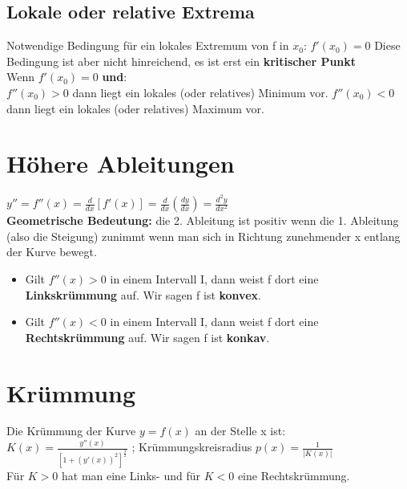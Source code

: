 \documentclass[../main.tex]{subfiles}
\begin{document}
\subsection{Lokale oder relative Extrema}
Notwendige Bedingung für ein lokales Extremum von f in $x_0$:
$f'(x_0) = 0$ Diese Bedingung ist aber nicht hinreichend, es ist erst ein \textbf{kritischer Punkt} \\ [14pt]
Wenn $f'(x_0) = 0$ \textbf{und}: \\
$f''(x_0) > 0$ dann liegt ein lokales (oder relatives) Minimum vor.
$f''(x_0) < 0$ dann liegt ein lokales (oder relatives) Maximum vor.

\section{Höhere Ableitungen}
$y'' = f''(x) = \frac{d}{dx}[f'(x)] = \frac{d}{dx}(\frac{dy}{dx}) = \frac{d^2y}{dx^2}$ \\ [7pt]
\textbf{Geometrische Bedeutung:} die 2. Ableitung ist positiv wenn die 1. Ableitung (also die Steigung) zunimmt wenn man sich in Richtung zunehmender x entlang der Kurve bewegt.
\begin{itemize}
    \item Gilt $f''(x) > 0$ in einem Intervall I, dann weist f dort eine \textbf{Linkskrümmung} auf. Wir sagen f ist \textbf{konvex}.
    \item Gilt $f''(x) < 0$ in einem Intervall I, dann weist f dort eine \textbf{Rechtskrümmung} auf. Wir sagen f ist \textbf{konkav}.
\end{itemize}

\section{Krümmung}
Die Krümmung der Kurve $y = f(x)$ an der Stelle x ist: \\ [7pt]
$K(x) = \frac{y''(x)}{[1+(y'(x))^2]^{\frac{3}{2}}}$ ; Krümmungskreisradius $p(x)=\frac{1}{|K(x)|}$ \\ [7pt]
Für $K > 0$ hat man eine Links- und für $K < 0$ eine Rechtskrümmung.
\end{document}
